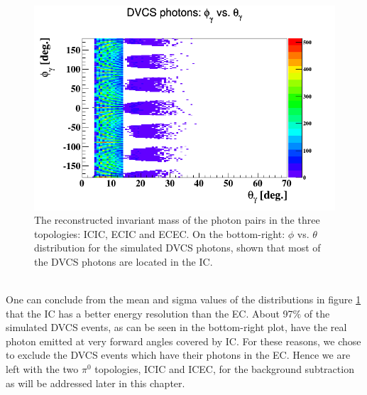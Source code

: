 \begin{figure}[tbp]
\hspace{-0.2in}
\includegraphics[scale=0.38]{fig_analysis/sim_photon_phi_theta_2.png}
\caption{The reconstructed invariant mass of the photon pairs in the three topologies: ICIC, ECIC and ECEC. On the bottom-right: $\phi$ vs. $\theta$ distribution for the simulated DVCS photons, shown that most of the DVCS photons are located in the IC.} 
\label{fig:pi0_selection}
\end{figure}\\

One can conclude from the mean and sigma values of the distributions in figure \ref{fig:pi0_selection} that the IC has a better energy resolution than the EC. About 97$\%$ of the simulated DVCS events, as can be seen in the bottom-right plot, have the real photon emitted at very forward angles covered by IC. For these reasons, we chose to exclude the DVCS events which have their photons in the EC. Hence we are left with the two $\pi^{0}$ topologies, ICIC and ICEC, for the background subtraction as will be addressed later in this chapter.


